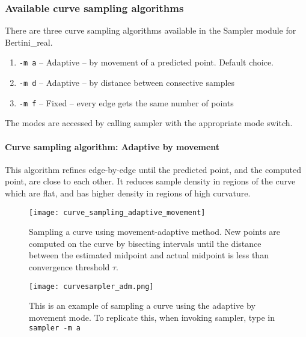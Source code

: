  	\subsubsection{Available curve sampling algorithms}
 	

 	There are three curve sampling algorithms available in the Sampler module for Bertini\_real.

 	\begin{enumerate}

 		\item {\tt -m a} -- Adaptive -- by movement of a predicted point.  Default choice.

 		\item {\tt -m d} -- Adaptive -- by distance between consective samples

 		\item {\tt -m f} -- Fixed -- every edge gets the same number of points

 	\end{enumerate}

The modes are accessed by calling sampler with the appropriate mode switch.


\paragraph{Curve sampling algorithm: Adaptive by movement}

This algorithm refines edge-by-edge until the predicted point, and the computed point, are close to each other.  It reduces sample density in regions of the curve which are flat, and has higher density in regions of high curvature.


\begin{figure}[H]
\begin{center}
\texttt{[image: curve\_sampling\_adaptive\_movement]}
\caption[Adaptive-movement curve sampling]{Sampling a curve using movement-adaptive method.  New points are computed on the curve by bisecting intervals until the distance between the estimated midpoint and actual midpoint is less than convergence threshold $\tau$.}
\end{center}
\end{figure}
 
\begin{figure}[H]
\centering
\texttt{[image: curvesampler\_adm.png]}
\caption{This is an example of sampling a curve using the adaptive by movement mode. To replicate this, when invoking sampler, type in {\tt sampler -m a}}
\end{figure}

